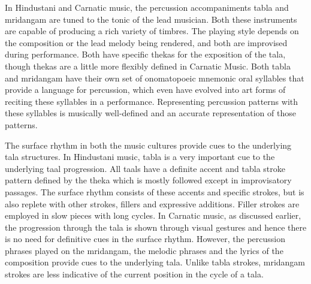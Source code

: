 In Hindustani and Carnatic music, the percussion accompaniments \gls{tabla} and mridangam are tuned to the tonic of the lead musician. Both these instruments are capable of producing a rich variety of timbres. The playing style depends on the composition or the lead melody being rendered, and both are improvised during performance. Both have specific \glspl{theka} for the exposition of the \gls{tala}, though \glspl{theka} are a little more flexibly defined in Carnatic Music. Both \gls{tabla} and mridangam have their own set of onomatopoeic mnemonic oral syllables that provide a language for percussion, which even have evolved into art forms of reciting these syllables in a performance. Representing percussion patterns with these syllables is musically well-defined and an accurate representation of those patterns. 

The surface rhythm in both the music cultures provide cues to the underlying \gls{tala} structures. In Hindustani music, \gls{tabla} is a very important cue to the underlying \gls{taal} progression. All \glspl{taal} have a definite accent and \gls{tabla} stroke pattern defined by the \gls{theka} which is mostly followed except in improvisatory passages. The surface rhythm consists of these accents and specific strokes, but is also replete with other strokes, fillers and expressive additions. Filler strokes are employed in slow pieces with long cycles. In Carnatic music, as discussed earlier, the progression through the \gls{tala} is shown through visual gestures and hence there is no need for definitive cues in the surface rhythm. However, the percussion phrases played on the mridangam, the melodic phrases and the lyrics of the composition provide cues to the underlying \gls{tala}. Unlike \gls{tabla} strokes, mridangam strokes are less indicative of the current position in the cycle of a \gls{tala}. 

